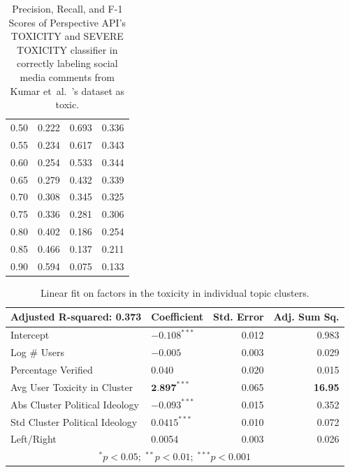 \begin{table}[t]
\begin{tabular}{lrrr}
      0.50 & 0.222 & 0.693 & 0.336\\
      0.55 & 0.234 & 0.617 & 0.343\\
      0.60 & 0.254 & 0.533 &0.344\\
      0.65 & 0.279 & 0.432 &0.339\\
      0.70 & 0.308 & 0.345 &0.325\\
       0.75 & 0.336 & 0.281 &0.306\\
       0.80 & 0.402 & 0.186 &0.254\\
       0.85 & 0.466 & 0.137 &0.211\\
       0.90 & 0.594 & 0.075 &0.133\\
\end{tabular}
\caption{Precision, Recall, and F-1 Scores of Perspective API's TOXICITY and SEVERE TOXICITY classifier in correctly labeling social media comments from Kumar et~al.~\cite{kumar2021designing}'s dataset as toxic.}
\label{tbl:perspective-f1}
\vspace{-15pt}
\end{table}


\begin{table}
    \small
    \centering
    \begin{tabularx}{0.7\columnwidth}{l|lrr}
    \toprule
  Adjusted R-squared:  0.373  & Coefficient  & Std. Error & Adj. Sum Sq. \\    \midrule
  Intercept &${-0.108}^{***}$& 0.012 & 0.983\\
  Log \# Users & $-0.005$ & 0.003 &0.029 \\
  Percentage Verified & $0.040$& 0.020 & 0.015 \\
  Avg User Toxicity in Cluster & $\textbf{2.897}^{***}$ & 0.065 & \textbf{16.95} \\
 Abs Cluster Political Ideology  & $-0.093^{***}$ & 0.015  & 0.352\\
 Std Cluster Political Ideology  &  $0.0415^{***}$ & 0.010 &0.072	\\
  Left/Right  & 0.0054& 0.003 &0.026\\
    \bottomrule
     \multicolumn{4}{c}{ $^\ast p<0.05; \;  ^{**} p<0.01; \; ^{***}p<0.001$ }
    \end{tabularx}
  \caption{Linear fit on factors in the toxicity in individual topic clusters. } 
   \vspace{-15pt}
   \label{table:regression-cluster-toxicity}
\end{table}

